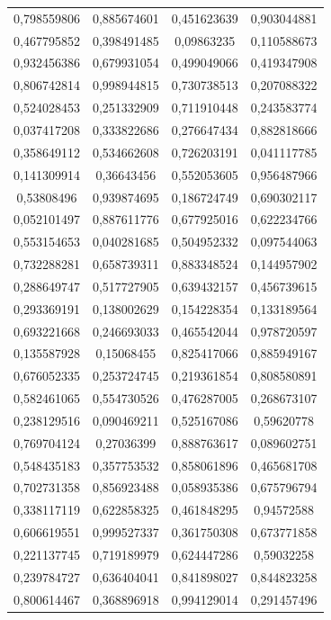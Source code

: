 \documentclass[a4paper,12pt]{article}
\begin{document}
\begin{longtable}{|c|c|c|c|}
0,798559806 & 0,885674601 & 0,451623639 & 0,903044881 \\
0,467795852 & 0,398491485 & 0,09863235 & 0,110588673 \\
0,932456386 & 0,679931054 & 0,499049066 & 0,419347908 \\
0,806742814 & 0,998944815 & 0,730738513 & 0,207088322 \\
0,524028453 & 0,251332909 & 0,711910448 & 0,243583774 \\
0,037417208 & 0,333822686 & 0,276647434 & 0,882818666 \\
0,358649112 & 0,534662608 & 0,726203191 & 0,041117785 \\
0,141309914 & 0,36643456 & 0,552053605 & 0,956487966 \\
0,53808496 & 0,939874695 & 0,186724749 & 0,690302117 \\
0,052101497 & 0,887611776 & 0,677925016 & 0,622234766 \\
0,553154653 & 0,040281685 & 0,504952332 & 0,097544063 \\
0,732288281 & 0,658739311 & 0,883348524 & 0,144957902 \\
0,288649747 & 0,517727905 & 0,639432157 & 0,456739615 \\
0,293369191 & 0,138002629 & 0,154228354 & 0,133189564 \\
0,693221668 & 0,246693033 & 0,465542044 & 0,978720597 \\
0,135587928 & 0,15068455 & 0,825417066 & 0,885949167 \\
0,676052335 & 0,253724745 & 0,219361854 & 0,808580891 \\
0,582461065 & 0,554730526 & 0,476287005 & 0,268673107 \\
0,238129516 & 0,090469211 & 0,525167086 & 0,59620778 \\
0,769704124 & 0,27036399 & 0,888763617 & 0,089602751 \\
0,548435183 & 0,357753532 & 0,858061896 & 0,465681708 \\
0,702731358 & 0,856923488 & 0,058935386 & 0,675796794 \\
0,338117119 & 0,622858325 & 0,461848295 & 0,94572588 \\
0,606619551 & 0,999527337 & 0,361750308 & 0,673771858 \\
0,221137745 & 0,719189979 & 0,624447286 & 0,59032258 \\
0,239784727 & 0,636404041 & 0,841898027 & 0,844823258 \\
0,800614467 & 0,368896918 & 0,994129014 & 0,291457496 \\

\end{longtable}
\end{document}
